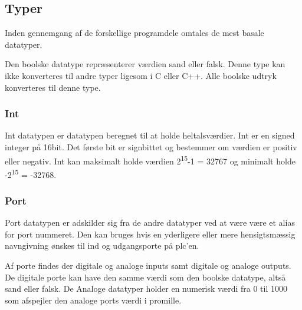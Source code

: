 \subsection{Typer}
Inden gennemgang af de forskellige programdele omtales de mest basale datatyper.

Den boolske datatype repræsenterer værdien sand eller falsk. Denne type kan ikke konverteres til andre typer ligesom i C eller C++. Alle boolske udtryk konverteres til denne type.

\subsubsection{Int}
Int datatypen er datatypen beregnet til at holde heltalsværdier. Int er en signed integer på 16bit. Det første bit er signbittet og bestemmer om værdien er positiv eller negativ. Int kan maksimalt holde værdien 2\textsuperscript{15}-1 = 32767 og minimalt holde -2\textsuperscript{15} = -32768.

\subsubsection{Port}
Port datatypen er adskilder sig fra de andre datatyper ved at være være et alias for port nummeret. Den kan bruges hvis en yderligere eller mere hensigtsmæssig navngivning ønskes til ind og udgangsporte på \gls{plc}'en.

Af porte findes der digitale og analoge inputs samt digitale og analoge outputs. De digitale porte kan have den samme værdi som den boolske datatype, altså sand eller falsk. De Analoge datatyper holder en numerisk værdi fra 0 til 1000 som afspejler den analoge ports værdi i promille.
